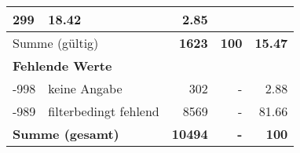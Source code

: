 \begin{longtable}{lXrrr}
       \num{299} &
       \num[round-mode=places,round-precision=2]{18.42} &
         \num[round-mode=places,round-precision=2]{2.85} \\
     \midrule
     \multicolumn{2}{l}{Summe (gültig)} &
       \textbf{\num{1623}} &
     \textbf{\num{100}} &
       \textbf{\num[round-mode=places,round-precision=2]{15.47}} \\
     \multicolumn{5}{l}{\textbf{Fehlende Werte}}\\
       -998 &
       keine Angabe &
         \num{302} &
        - &
         \num[round-mode=places,round-precision=2]{2.88} \\
       -989 &
       filterbedingt fehlend &
         \num{8569} &
        - &
         \num[round-mode=places,round-precision=2]{81.66} \\
     \midrule
     \multicolumn{2}{l}{\textbf{Summe (gesamt)}} &
          \textbf{\num{10494}} &
        \textbf{-} &
        \textbf{\num{100}} \\
     \bottomrule
     \end{longtable}
     
